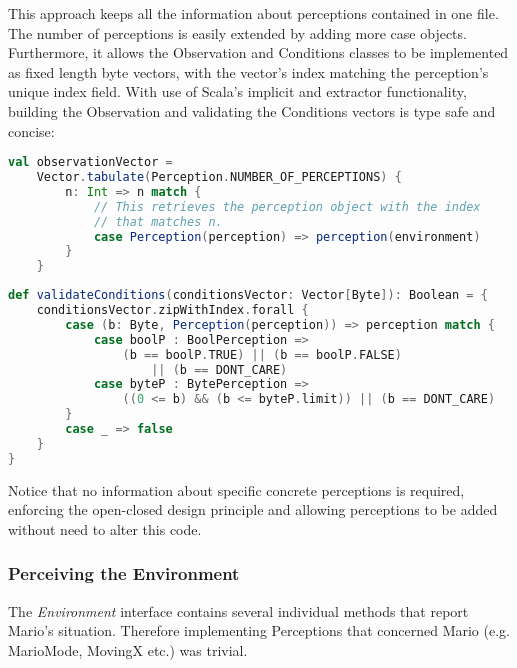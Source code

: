 This approach keeps all the information about perceptions contained in one file. The number of perceptions is easily extended by adding more case objects. Furthermore, it allows the Observation and Conditions classes to be implemented as fixed length byte vectors, with the vector's index matching the perception's unique index field. With use of Scala's implicit and extractor functionality, building the Observation and validating the Conditions vectors is type safe and concise:


\begin{minipage}{0.9\linewidth}
\centering
\begin{lstlisting}[language=scala]
val observationVector = 
    Vector.tabulate(Perception.NUMBER_OF_PERCEPTIONS) {
        n: Int => n match {
            // This retrieves the perception object with the index
            // that matches n. 
            case Perception(perception) => perception(environment)
        }
    }
\end{lstlisting}
\end{minipage}

\begin{minipage}{0.9\linewidth}
\centering
\begin{lstlisting}[language=scala]
def validateConditions(conditionsVector: Vector[Byte]): Boolean = {
    conditionsVector.zipWithIndex.forall {
        case (b: Byte, Perception(perception)) => perception match {
            case boolP : BoolPerception => 
                (b == boolP.TRUE) || (b == boolP.FALSE) 
                    || (b == DONT_CARE)
            case byteP : BytePerception => 
                ((0 <= b) && (b <= byteP.limit)) || (b == DONT_CARE)
        }
        case _ => false 
    }
}

\end{lstlisting}
\end{minipage}

Notice that no information about specific concrete perceptions is required, enforcing the open-closed design principle and allowing perceptions to be added without need to alter this code.

\subsubsection{Perceiving the Environment}

The \emph{Environment} interface contains several individual methods that report Mario's situation. Therefore implementing Perceptions that concerned Mario (e.g. MarioMode, MovingX etc.) was trivial.

